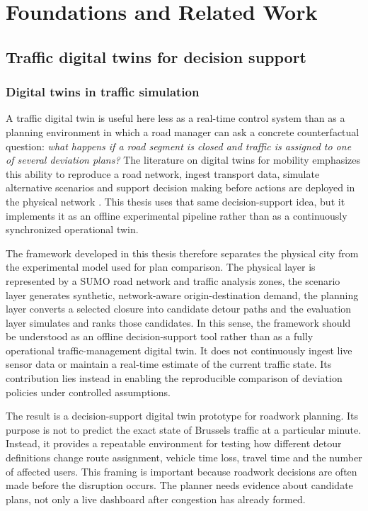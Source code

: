 \section{Foundations and Related Work}

\subsection{Traffic digital twins for decision support}

\subsubsection{Digital twins in traffic simulation}
\label{dt_traffic_simulation}

A traffic digital twin is useful here less as a real-time control system than as a planning
environment in which a road manager can ask a concrete counterfactual question: \emph{what happens if a
road segment is closed and traffic is assigned to one of several deviation plans?} The literature on
digital twins for mobility emphasizes this ability to reproduce a road network, ingest transport
data, simulate alternative scenarios and support decision making before actions are deployed in the
physical network \cite{data_mining_dt,intelligent_transport,digital_twin_transport}.
This thesis uses that same
decision-support idea, but it implements it as an offline experimental pipeline rather than as a
continuously synchronized operational twin.

The framework developed in this thesis therefore separates the physical city from the 
experimental model used for plan comparison. The physical layer is represented by a SUMO 
road network and traffic analysis zones, the scenario layer generates synthetic, network-aware 
origin-destination demand, the planning layer converts a selected closure into candidate detour 
paths and the evaluation layer simulates and ranks those candidates. In this sense, the framework 
should be understood as an offline decision-support tool rather than as a fully operational 
traffic-management digital twin. It does not continuously ingest live sensor data or maintain 
a real-time estimate of the current traffic state. Its contribution lies instead in enabling the 
reproducible comparison of deviation policies under controlled assumptions.


The result is a decision-support digital twin prototype for roadwork planning. Its purpose is not to
predict the exact state of Brussels traffic at a particular minute. Instead, it provides a
repeatable environment for testing how different detour definitions change route assignment,
vehicle time loss, travel time and the number of affected users. This framing is important because
roadwork decisions are often made before the disruption occurs. The planner needs evidence about
candidate plans, not only a live dashboard after congestion has already formed.

